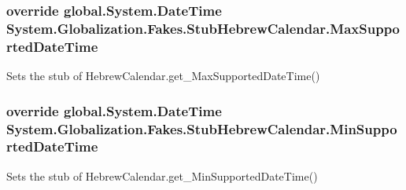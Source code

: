 \hypertarget{class_system_1_1_globalization_1_1_fakes_1_1_stub_hebrew_calendar_a5cd81a193b6f0c151ccf2b8c799556dd}{
\subsubsection[{Max\-Supported\-Date\-Time}]{\setlength{\rightskip}{0pt plus 5cm}override global.\-System.\-Date\-Time System.\-Globalization.\-Fakes.\-Stub\-Hebrew\-Calendar.\-Max\-Supported\-Date\-Time\hspace{0.3cm}{\ttfamily [get]}}}\label{class_system_1_1_globalization_1_1_fakes_1_1_stub_hebrew_calendar_a5cd81a193b6f0c151ccf2b8c799556dd}


Sets the stub of Hebrew\-Calendar.\-get\-\_\-\-Max\-Supported\-Date\-Time()

\hypertarget{class_system_1_1_globalization_1_1_fakes_1_1_stub_hebrew_calendar_af92f64f174b129cc78421e5bbcc5c66a}{
\subsubsection[{Min\-Supported\-Date\-Time}]{\setlength{\rightskip}{0pt plus 5cm}override global.\-System.\-Date\-Time System.\-Globalization.\-Fakes.\-Stub\-Hebrew\-Calendar.\-Min\-Supported\-Date\-Time\hspace{0.3cm}{\ttfamily [get]}}}\label{class_system_1_1_globalization_1_1_fakes_1_1_stub_hebrew_calendar_af92f64f174b129cc78421e5bbcc5c66a}


Sets the stub of Hebrew\-Calendar.\-get\-\_\-\-Min\-Supported\-Date\-Time()

